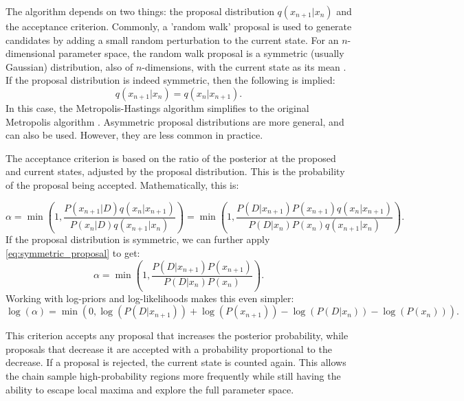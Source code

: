 \documentclass[preprint,longauthor]{aastex631}
\numberwithin{equation}{section}
\begin{document}
The algorithm depends on two things: the proposal distribution $q(x_{n+1}|x_n)$ and the acceptance criterion. Commonly, a 'random walk' proposal is used to generate candidates by adding a small random perturbation to the current state. For an $n$-dimensional parameter space, the random walk proposal is a symmetric (usually Gaussian) distribution, also of $n$-dimensions, with the current state as its mean \citep{vontoussaintBayesianInferencePhysics2011}. If the proposal distribution is indeed symmetric, then the following is implied:
\begin{equation}
  \label{eq:symmetric_proposal}
  q(x_{n+1}|x_n) = q(x_n|x_{n+1}).
\end{equation}
In this case, the Metropolis-Hastings algorithm simplifies to the original Metropolis algorithm \citep{brewer1BayesianInference2018}. Asymmetric proposal distributions are more general, and can also be used. However, they are less common in practice.

The acceptance criterion is based on the ratio of the posterior at the proposed and current states, adjusted by the proposal distribution. This is the probability of the proposal being accepted. Mathematically, this is:

\begin{equation}
  \alpha = \min\left(1, \frac{P(x_{n+1}|D) q(x_n|x_{n+1})}{P(x_n|D) q(x_{n+1}|x_n)}\right) = \min\left(1, \frac{P(D|x_{n+1}) P(x_{n+1}) q(x_n|x_{n+1})}{P(D|x_n) P(x_n) q(x_{n+1}|x_n)}\right).
\end{equation}
If the proposal distribution is symmetric, we can further apply \autoref{eq:symmetric_proposal} to get:
\begin{equation}
  \alpha = \min\left(1, \frac{P(D|x_{n+1}) P(x_{n+1})}{P(D|x_n) P(x_n)}\right).
\end{equation}
Working with log-priors and log-likelihoods makes this even simpler:
\begin{equation}
  \log(\alpha) = \min\left(0, \log(P(D|x_{n+1})) + \log(P(x_{n+1})) - \log(P(D|x_n)) - \log(P(x_n))\right).
\end{equation}

This criterion accepts any proposal that increases the posterior probability, while proposals that decrease it are accepted with a probability proportional to the decrease. If a proposal is rejected, the current state is counted again. This allows the chain sample high-probability regions more frequently while still having the ability to escape local maxima and explore the full parameter space.
\end{document}
